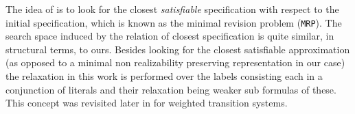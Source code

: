 






The idea of \cite{DBLP:conf/icra/KimFS12} is to look for the closest \textit{satisfiable} specification with respect to the initial specification, which is known as the minimal revision problem (\texttt{MRP}).  The search space induced by the relation of closest specification is quite similar, in structural terms, to ours. Besides looking for the closest satisfiable approximation (as opposed to a minimal non realizability preserving representation in our case) the relaxation in this work is performed over the labels consisting each in a conjunction of literals and their relaxation being weaker sub formulas of these.  This concept was revisited later in \cite{DBLP:conf/icra/KimF13} for weighted transition systems.



